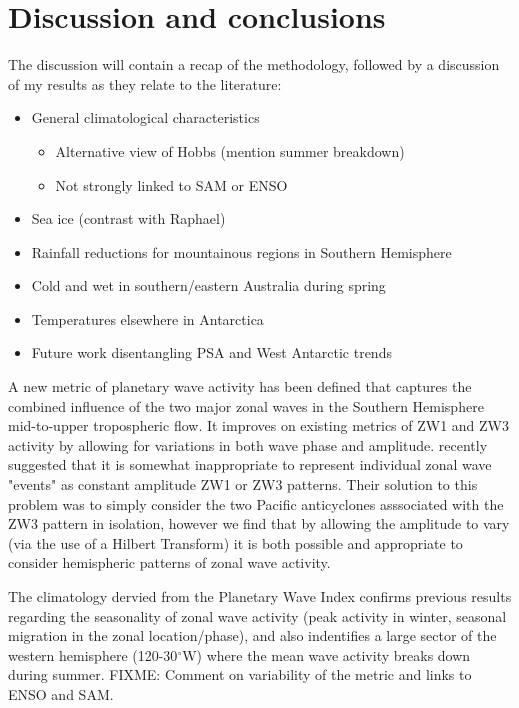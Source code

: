 \section{Discussion and conclusions}

The discussion will contain a recap of the methodology, followed by a discussion of my results as they relate to the literature:
\begin{itemize}
\item General climatological characteristics
\begin{itemize}
\item Alternative view of Hobbs (mention summer breakdown)
\item Not strongly linked to SAM or ENSO
\end{itemize}
\item Sea ice (contrast with Raphael)
\item Rainfall reductions for mountainous regions in Southern Hemisphere
\item Cold and wet in southern/eastern Australia during spring
\item Temperatures elsewhere in Antarctica
\item Future work disentangling PSA and West Antarctic trends
\end{itemize}

A new metric of planetary wave activity has been defined that captures the combined influence of the two major zonal waves in the Southern Hemisphere mid-to-upper tropospheric flow. It improves on existing metrics of ZW1 and ZW3 activity by allowing for variations in both wave phase and amplitude. \citet{Hobbs2010} recently suggested that it is somewhat inappropriate to represent individual zonal wave "events" as constant amplitude ZW1 or ZW3 patterns. Their solution to this problem was to simply consider the two Pacific anticyclones asssociated with the ZW3 pattern in isolation, however we find that by allowing the amplitude to vary (via the use of a Hilbert Transform) it is both possible and appropriate to consider hemispheric patterns of zonal wave activity.  

The climatology dervied from the Planetary Wave Index confirms previous results regarding the seasonality of zonal wave activity (peak activity in winter, seasonal migration in the zonal location/phase), and also indentifies a large sector of the western hemisphere (120-30$^{\circ}$W) where the mean wave activity breaks down during summer. FIXME: Comment on variability of the metric and links to ENSO and SAM.

